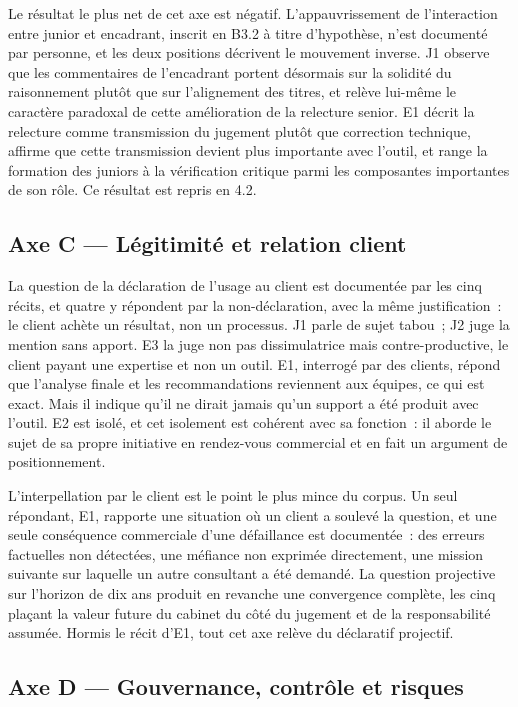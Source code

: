 Le résultat le plus net de cet axe est négatif. L'appauvrissement de l'interaction entre
junior et encadrant, inscrit en B3.2 à titre d'hypothèse, n'est documenté par personne, et
les deux positions décrivent le mouvement inverse. J1 observe que les commentaires de
l'encadrant portent désormais sur la solidité du raisonnement plutôt que sur l'alignement des
titres, et relève lui-même le caractère paradoxal de cette amélioration de la relecture
senior. E1 décrit la relecture comme transmission du jugement plutôt que correction
technique, affirme que cette transmission devient plus importante avec l'outil, et range la
formation des juniors à la vérification critique parmi les composantes importantes de son
rôle. Ce résultat est repris en 4.2.

\subsection{Axe C --- Légitimité et relation client}

La question de la déclaration de l'usage au client est documentée par les cinq récits, et
quatre y répondent par la non-déclaration, avec la même
justification~: le client achète un résultat, non un processus. J1 parle de sujet tabou~; J2
juge la mention sans apport. E3 la juge non pas dissimulatrice mais contre-productive, le
client payant une expertise et non un outil. E1, interrogé par des clients, répond que
l'analyse finale et les recommandations reviennent aux équipes, ce qui est exact. Mais il
indique qu'il ne dirait jamais qu'un support a été produit avec l'outil. E2 est isolé, et cet
isolement est cohérent avec sa fonction~: il aborde le sujet de sa propre initiative en
rendez-vous commercial et en fait un argument de positionnement.

L'interpellation par le client est le point le plus mince du corpus. Un seul répondant, E1,
rapporte une situation où un client a soulevé la question, et une seule conséquence
commerciale d'une défaillance est documentée~: des erreurs factuelles non détectées, une
méfiance non exprimée directement, une mission suivante sur laquelle un autre consultant a
été demandé. La question projective sur l'horizon de dix ans produit en revanche une
convergence complète, les cinq plaçant la valeur future du cabinet du côté du jugement et de
la responsabilité assumée. Hormis le récit d'E1, tout cet axe relève du déclaratif projectif.

\subsection{Axe D --- Gouvernance, contrôle et risques}

